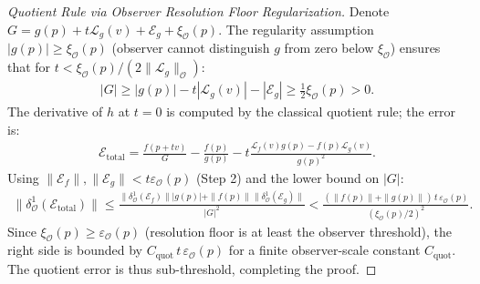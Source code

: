\begin{proof}[Quotient Rule via Observer Resolution Floor Regularization]
Denote $G = g(p) + t\mathcal{L}_g(v) + \mathcal{E}_g + \xi_{\mathcal{O}}(p)$. The regularity assumption $|g(p)| \geq \xi_{\mathcal{O}}(p)$ (observer cannot distinguish $g$ from zero below $\xi_{\mathcal{O}}$) ensures that for $t < \xi_{\mathcal{O}}(p)/(2\|\mathcal{L}_g\|_{\mathcal{O}})$:
\begin{align}
|G| \geq |g(p)| - t|\mathcal{L}_g(v)| - |\mathcal{E}_g| \geq \tfrac{1}{2}\xi_{\mathcal{O}}(p) > 0.
\end{align}
The derivative of $h$ at $t=0$ is computed by the classical quotient rule; the error is:
\begin{align}
\mathcal{E}_{\text{total}} = \frac{f(p+tv)}{G} - \frac{f(p)}{g(p)} - t\frac{\mathcal{L}_f(v)g(p) - f(p)\mathcal{L}_g(v)}{g(p)^2}.
\end{align}
Using $\|\mathcal{E}_f\|, \|\mathcal{E}_g\| < t\varepsilon_{\mathcal{O}}(p)$ (Step 2) and the lower bound on $|G|$:
\begin{align}
\|\delta^1_{\mathcal{O}}(\mathcal{E}_{\text{total}})\| \leq \frac{\|\delta^1_{\mathcal{O}}(\mathcal{E}_f)\||g(p)| + \|f(p)\|\|\delta^1_{\mathcal{O}}(\mathcal{E}_g)\|}{|G|^2} < \frac{(\|f(p)\|+\|g(p)\|)\,t\,\varepsilon_{\mathcal{O}}(p)}{(\xi_{\mathcal{O}}(p)/2)^2}.
\end{align}
Since $\xi_{\mathcal{O}}(p) \geq \varepsilon_{\mathcal{O}}(p)$ (resolution floor is at least the observer threshold), the right side is bounded by $C_{\text{quot}}\,t\,\varepsilon_{\mathcal{O}}(p)$ for a finite observer-scale constant $C_{\text{quot}}$. The quotient error is thus sub-threshold, completing the proof.
\end{proof}

